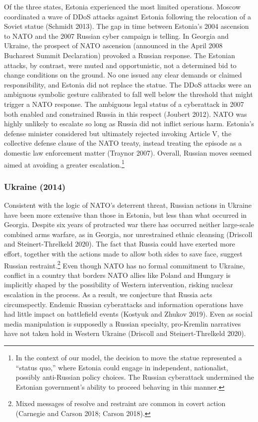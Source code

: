 \documentclass[
]{article}
\begin{document}
Of the three states, Estonia experienced the most limited operations. Moscow coordinated a wave of DDoS attacks against Estonia following the relocation of a Soviet statue (Schmidt 2013). The gap in time between Estonia's 2004 ascension to NATO and the 2007 Russian cyber campaign is telling. In Georgia and Ukraine, the prospect of NATO ascension (announced in the April 2008 Bucharest Summit Declaration) provoked a Russian response. The Estonian attacks, by contrast, were muted and opportunistic, not a determined bid to change conditions on the ground. No one issued any clear demands or claimed responsibility, and Estonia did not replace the statue. The DDoS attacks were an ambiguous symbolic gesture calibrated to fall well below the threshold that might trigger a NATO response. The ambiguous legal status of a cyberattack in 2007 both enabled and constrained Russia in this respect (Joubert 2012). NATO was highly unlikely to escalate so long as Russia did not inflict serious harm. Estonia's defense minister considered but ultimately rejected invoking Article V, the collective defense clause of the NATO treaty, instead treating the episode as a domestic law enforcement matter (Traynor 2007). Overall, Russian moves seemed aimed at avoiding a greater escalation.\footnote{In the context of our model, the decision to move the statue represented a ``status quo,'' where Estonia could engage in independent, nationalist, possibly anti-Russian policy choices. The Russian cyberattack undermined the Estonian government's ability to proceed behaving in this manner.}

\hypertarget{ukraine-2014}{%
\subsubsection{Ukraine (2014)}\label{ukraine-2014}}

Consistent with the logic of NATO's deterrent threat, Russian actions in Ukraine have been more extensive than those in Estonia, but less than what occurred in Georgia. Despite six years of protracted war there has occurred neither large-scale combined arms warfare, as in Georgia, nor unrestrained ethnic cleansing (Driscoll and Steinert-Threlkeld 2020). The fact that Russia could have exerted more effort, together with the actions made to allow both sides to save face, suggest Russian restraint.\footnote{Mixed messages of resolve and restraint are common in covert action (Carnegie and Carson 2018; Carson 2018).} Even though NATO has no formal commitment to Ukraine, conflict in a country that borders NATO allies like Poland and Hungary is implicitly shaped by the possibility of Western intervention, risking nuclear escalation in the process. As a result, we conjecture that Russia acts circumspectly. Endemic Russian cyberattacks and information operations have had little impact on battlefield events (Kostyuk and Zhukov 2019). Even as social media manipulation is supposedly a Russian specialty, pro-Kremlin narratives have not taken hold in Western Ukraine (Driscoll and Steinert-Threlkeld 2020).
\end{document}
